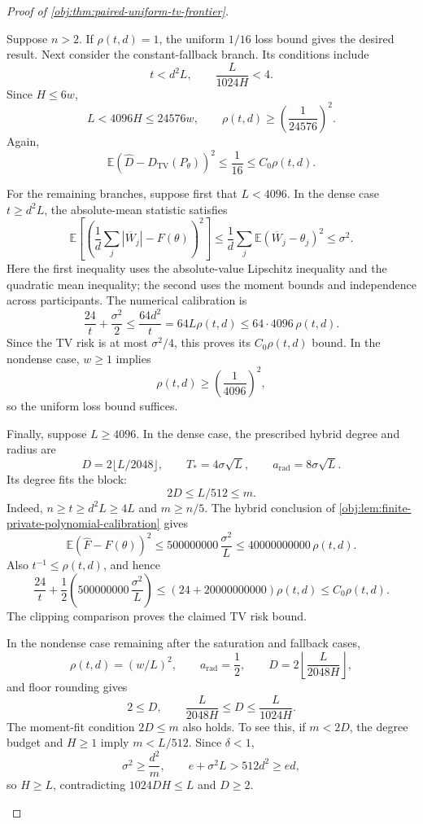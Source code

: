 \begin{proof}[Proof of \cref{obj:thm:paired-uniform-tv-frontier}]
\begin{enumerate}
Suppose \(n>2\). If \(\rho(t,d)=1\), the uniform \(1/16\) loss bound gives the desired result.
Next consider the constant-fallback branch. Its conditions include
\[
t<d^2L,\qquad \frac{L}{1024H}<4.
\]
Since \(H\le6w\),
\[
L<4096H\le24576w,
\qquad
\rho(t,d)\ge\left(\frac1{24576}\right)^2.
\]
Again,
\[
\mathbb E(\widehat D-D_{\mathrm{TV}}(P_\theta))^2
\le\frac1{16}\le C_0\rho(t,d).
\]

For the remaining branches, suppose first that \(L<4096\).
In the dense case \(t\ge d^2L\), the absolute-mean statistic satisfies
\[
\mathbb E\left[
\left(\frac1d\sum_j|\overline W_j|-F(\theta)\right)^2
\right]
\le\frac1d\sum_j\mathbb E(\overline W_j-\theta_j)^2
\le\sigma^2.
\]
Here the first inequality uses the absolute-value Lipschitz inequality and the quadratic mean inequality; the second uses the moment bounds and independence across participants. The numerical calibration is
\[
\frac{24}{t}+\frac{\sigma^2}{2}
\le\frac{64d^2}{t}
=64L\rho(t,d)
\le64\cdot4096\,\rho(t,d).
\]
Since the TV risk is at most \(\sigma^2/4\), this proves its \(C_0\rho(t,d)\) bound.
In the nondense case, \(w\ge1\) implies
\[
\rho(t,d)\ge\left(\frac1{4096}\right)^2,
\]
so the uniform loss bound suffices.

Finally, suppose \(L\ge4096\).
In the dense case, the prescribed hybrid degree and radius are
\[
D=2\lfloor L/2048\rfloor,\qquad
T_*=4\sigma\sqrt L,\qquad a_{\mathrm{rad}}=8\sigma\sqrt L.
\]
Its degree fits the block:
\[
2D\le L/512\le m.
\]
Indeed, \(n\ge t\ge d^2L\ge4L\) and \(m\ge n/5\).
The hybrid conclusion of \cref{obj:lem:finite-private-polynomial-calibration} gives
\[
\mathbb E(\widehat F-F(\theta))^2
\le500000000\,\frac{\sigma^2}{L}
\le40000000000\,\rho(t,d).
\]
Also \(t^{-1}\le\rho(t,d)\), and hence
\[
\frac{24}{t}
+\frac12\left(500000000\,\frac{\sigma^2}{L}\right)
\le(24+20000000000)\rho(t,d)
\le C_0\rho(t,d).
\]
The clipping comparison proves the claimed TV risk bound.

In the nondense case remaining after the saturation and fallback cases,
\[
\rho(t,d)=(w/L)^2,\qquad
a_{\mathrm{rad}}=\frac12,\qquad
D=2\left\lfloor\frac{L}{2048H}\right\rfloor,
\]
and floor rounding gives
\[
2\le D,\qquad
\frac{L}{2048H}\le D\le\frac{L}{1024H}.
\]
The moment-fit condition \(2D\le m\) also holds. To see this, if \(m<2D\), the degree budget and \(H\ge1\) imply \(m<L/512\).
Since \(\delta<1\),
\[
\sigma^2\ge\frac{d^2}{m},
\qquad
e+\sigma^2L>512d^2\ge ed,
\]
so \(H\ge L\), contradicting \(1024DH\le L\) and \(D\ge2\).


\end{enumerate}
\end{proof}
